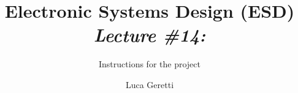 \documentclass{beamer}
\title[ESD \#14]{Electronic Systems Design (ESD) \\ {\em \small Lecture \#14:}}
\subtitle{Instructions for the project}
\author{Luca Geretti}
\date{}
\institute{\uppercase{Università degli Studi di Udine}\\\url{luca.geretti@uniud.it}\\\url{https://bitbucket.org/uniud_esd/course}}
\begin{document}
\begin{frame}[plain,t]
\titlepage
\end{frame}

\end{document}
